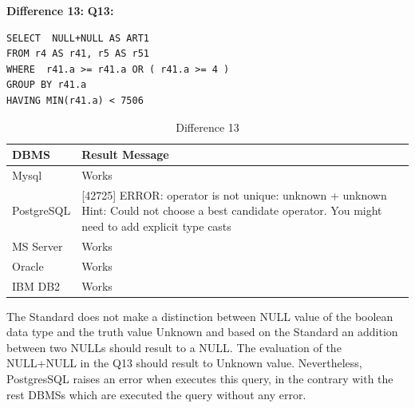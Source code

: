 \hfill\newline
\hfill\newline\textbf{Difference 13:}
\hfill\newline\textbf{Q13:}

\begin{mdframed}[backgroundcolor=lightgray!20]
\begin{lstlisting}[style=SQL]
SELECT  NULL+NULL AS ART1
FROM r4 AS r41, r5 AS r51
WHERE  r41.a >= r41.a OR ( r41.a >= 4 )
GROUP BY r41.a
HAVING MIN(r41.a) < 7506
\end{lstlisting}
\end{mdframed}

\begin{table}[h]
\centering
\caption{Difference 13}
\label{my-label}
\begin{tabular}{|p{2cm}|p{11.5cm}| }
\hline
\textbf{DBMS} & \textbf{Result Message}                                                                                                                                  \\ \hline
Mysql         & Works                                                                                                                                                    \\ \hline
PostgreSQL    & {[}42725{]} ERROR: operator is not unique: unknown + unknown Hint: Could not choose a best candidate operator. You might need to add explicit type casts \\ \hline
MS Server     & Works                                                                                                                                                    \\ \hline
Oracle        & Works                                                                                                                                                    \\ \hline
IBM DB2       & Works                                                                                                                                                    \\ \hline
\end{tabular}
\end{table}

The Standard does not make a distinction between NULL value of the boolean data type and the truth value Unknown and based on the Standard an addition between two NULLs should result to a NULL. The evaluation of the NULL+NULL in the Q13 should result to Unknown value. Nevertheless, PostgresSQL raises an error when executes this query, in the contrary with the rest DBMSs which are executed the query without any error. 


